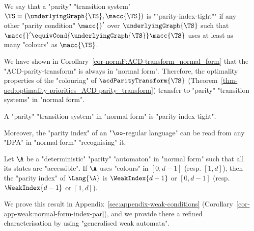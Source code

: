 \documentclass{theoretics}
\begin{document}



\begin{definition}\label{def:parity_tight_TS}
	\AP We say that a "parity" "transition system" $\TS = (\underlyingGraph{\TS}, \macc{\TS})$ is ""parity-index-tight"" if any other "parity condition" $\macc{}'$ over $\underlyingGraph{\TS}$ such that $\macc{}' \equivCond{\underlyingGraph{\TS}} \macc{\TS}$ uses at least as many "colours" as $\macc{\TS}$.
\end{definition}


We have shown in Corollary~\ref{cor-normF:ACD-transform_normal_form} that the "ACD-parity-transform" is always in "normal form". Therefore, the optimality properties of the "colouring" of $\acdParityTransform{\TS}$ (Theorem~\ref{thm-acd:optimality-priorities_ACD-parity_transform}) transfer to "parity" "transition systems" in "normal form".

\begin{corollary}\label{lemma-normF:normal_form-implies-strong_parity_index}
	A "parity" "transition system" in "normal form" is "parity-index-tight".
\end{corollary}


Moreover, the "parity index" of an "$\oo$-regular language" can be read from any "DPA" in "normal form" "recognising" it.

\begin{corollary}
	Let $\A$ be a "deterministic" "parity" "automaton" in "normal form" such that all its states are "accessible". 
	If $\A$ uses "colours" in $[0,d-1]$ (resp. $[1,d]$), then the "parity index" of $\Lang{\A}$ is $\WeakIndex{d-1}$ or $[0,d-1]$ (resp. $\WeakIndex{d-1}$ or $[1,d]$).
\end{corollary}


We prove this result in Appendix~\ref{sec:appendix-weak-conditions} (Corollary~\ref{cor-app-weak:normal-form-index-par}), and we provide there a refined characterisation by using "generalised weak automata".
\end{document}

